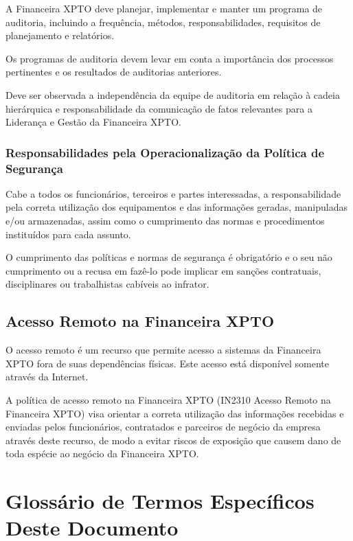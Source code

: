 \documentclass[a4paper,12pt]{article}
\begin{document}
A Financeira XPTO deve planejar, implementar e manter um programa de auditoria, incluindo a frequência, métodos, responsabilidades, requisitos de planejamento e relatórios.

Os programas de auditoria devem levar em conta a importância dos processos pertinentes e os resultados de auditorias anteriores.

Deve ser observada a independência da equipe de auditoria em relação à cadeia hierárquica e responsabilidade da comunicação de fatos relevantes para a Liderança e Gestão da Financeira XPTO.

\subsubsection{Responsabilidades pela Operacionalização da Política de Segurança}

Cabe a todos os funcionários, terceiros e partes interessadas, a responsabilidade pela correta utilização dos equipamentos e das informações geradas, manipuladas e/ou armazenadas, assim como o cumprimento das normas e procedimentos instituídos para cada assunto.

O cumprimento das políticas e normas de segurança é obrigatório e o seu não cumprimento ou a recusa em fazê-lo pode implicar em sanções contratuais, disciplinares ou trabalhistas cabíveis ao infrator.

\subsection{Acesso Remoto na Financeira XPTO}

O acesso remoto é um recurso que permite acesso a sistemas da Financeira XPTO fora de suas dependências físicas. Este acesso está disponível somente através da Internet.

A política de acesso remoto na Financeira XPTO (IN2310 Acesso Remoto na Financeira XPTO) visa orientar a correta utilização das informações recebidas e enviadas pelos funcionários, contratados e parceiros de negócio da empresa através deste recurso, de modo a evitar riscos de exposição que causem dano de toda espécie ao negócio da Financeira XPTO.

\section{Glossário de Termos Específicos Deste Documento}


\end{document}
